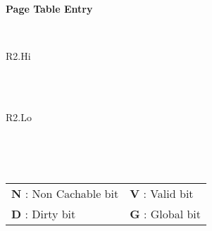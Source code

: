 \begin{minipage}{\textwidth}
\begin{framed}
	\begin{center}
		\textbf{Page Table Entry}
	\end{center}
	\centering
	\ttfamily
	\begin{bytefield}[bitwidth=10px,endianness=big]{32}
		\\
		\begin{rightwordgroup}{R2.Hi}
		   
		\end{rightwordgroup}\\
		\\
		\begin{rightwordgroup}{R2.Lo}
		     
		\end{rightwordgroup}\\
	\end{bytefield}\\
	\begin{tabular}{ll}
	\textbf{N} : Non Cachable bit & \textbf{V} : Valid bit \\
	\textbf{D} : Dirty bit & \textbf{G} : Global bit \\
	\end{tabular}
\end{framed}
\end{minipage}
